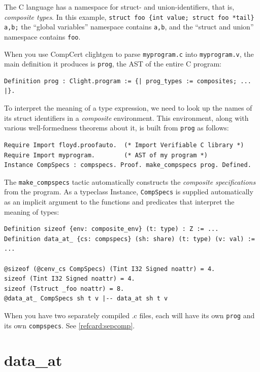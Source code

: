 \documentclass[12pt,fleqn,openany,oneside,showtrims]{memoir}
\begin{document}
The C language has a namespace for struct- and union-identifiers,
that is, \emph{composite types}.
In this example,
\lstinline|struct foo {int value; struct foo *tail}  a,b;|
the ``global variables'' namespace contains 
\lstinline{a,b}, and the ``struct and union'' namespace
contains \lstinline{foo}.

When you use CompCert clightgen to
parse \lstinline{myprogram.c} into \lstinline{myprogram.v},
the main definition it produces is
\lstinline{prog}, the AST of the entire
C program:
\begin{lstlisting}
Definition prog : Clight.program := {| prog_types := composites; ... |}.
\end{lstlisting}
To interpret the meaning of a type expression, we need
to look up the names of its struct identifiers
in a \emph{composite} environment.  This environment,
along with various well-formedness theorems about it,
is built from \lstinline{prog} as follows:

\begin{lstlisting}
Require Import floyd.proofauto.  (* Import Verifiable C library *)
Require Import myprogram.        (* AST of my program *)
Instance CompSpecs : compspecs. Proof. make_compspecs prog. Defined.
\end{lstlisting}
The \lstinline{make_compspecs} tactic automatically constructs
the \emph{composite specifications} from the program.
As a typeclass Instance, \lstinline{CompSpecs} is
supplied automatically as an implicit
argument to the functions and predicates that
interpret the meaning of types:

\begin{lstlisting}
Definition sizeof {env: composite_env} (t: type) : Z := ...
Definition data_at_ {cs: compspecs} (sh: share) (t: type) (v: val) := ...

@sizeof (@cenv_cs CompSpecs) (Tint I32 Signed noattr) = 4.
sizeof (Tint I32 Signed noattr) = 4.
sizeof (Tstruct _foo noattr) = 8.
@data_at_ CompSpecs sh t v |-- data_at sh t v
\end{lstlisting}

When you have two separately compiled .c files,
each will have its own \lstinline{prog} and its own
\lstinline{compspecs}.  See \autoref{refcard:sepcomp}.

\chapter{\upshape data\_at}
\label{refcard:data-at}
\end{document}
